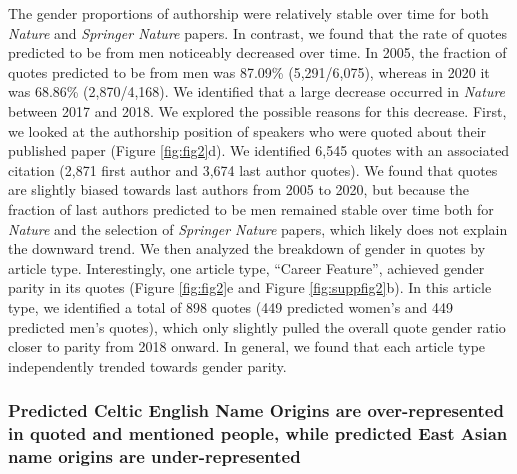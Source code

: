The gender proportions of authorship were relatively stable over time for both \emph{Nature} and \emph{Springer Nature} papers.
In contrast, we found that the rate of quotes predicted to be from men noticeably decreased over time.
In 2005, the fraction of quotes predicted to be from men was 87.09\% (5,291/6,075), whereas in 2020 it was 68.86\% (2,870/4,168).
We identified that a large decrease occurred in \emph{Nature} between 2017 and 2018.
We explored the possible reasons for this decrease.
First, we looked at the authorship position of speakers who were quoted about their published paper (Figure \ref{fig:fig2}d).
We identified 6,545 quotes with an associated citation (2,871 first author and 3,674 last author quotes).
We found that quotes are slightly biased towards last authors from 2005 to 2020, but because the fraction of last authors predicted to be men remained stable over time both for \emph{Nature} and the selection of \emph{Springer Nature} papers, which likely does not explain the downward trend.
We then analyzed the breakdown of gender in quotes by article type.
Interestingly, one article type, ``Career Feature'', achieved gender parity in its quotes (Figure \ref{fig:fig2}e and Figure \ref{fig:suppfig2}b).
In this article type, we identified a total of 898 quotes (449 predicted women's and 449 predicted men's quotes), which only slightly pulled the overall quote gender ratio closer to parity from 2018 onward.
In general, we found that each article type independently trended towards gender parity.

\hypertarget{predicted-celtic-english-name-origins-are-over-represented-in-quoted-and-mentioned-people-while-predicted-east-asian-name-origins-are-under-represented}{%
\subsubsection{Predicted Celtic English Name Origins are over-represented in quoted and mentioned people, while predicted East Asian name origins are under-represented}\label{predicted-celtic-english-name-origins-are-over-represented-in-quoted-and-mentioned-people-while-predicted-east-asian-name-origins-are-under-represented}}

